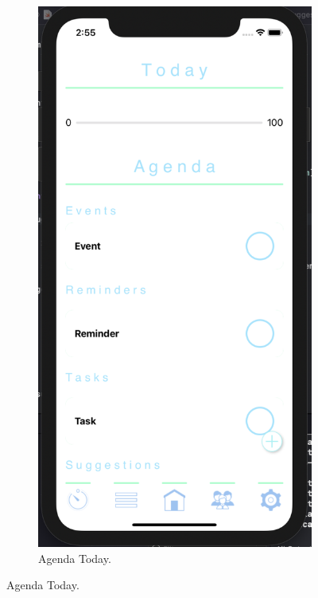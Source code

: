 \begin{figure}[H]
    \centering
    \begin{subfigure}[b]{0.3\textwidth}
        \centering
        \includegraphics[width=\textwidth]{./graphics/Implementation/Dashboard/agenda today populated.png}
        \caption{Agenda Today.}

\end{subfigure}
\end{figure}
